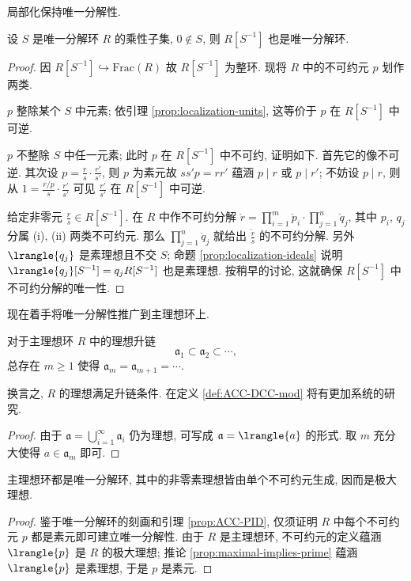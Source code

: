 局部化保持唯一分解性.
\begin{proposition}\label{prop:UFD-localization}
	设 $S$ 是唯一分解环 $R$ 的乘性子集, $0 \notin S$, 则 $R[S^{-1}]$ 也是唯一分解环.
\end{proposition}
\begin{proof}
	因 $R[S^{-1}] \hookrightarrow \text{Frac}(R)$ 故 $R[S^{-1}]$ 为整环. 现将 $R$ 中的不可约元 $p$ 划作两类.
	\begin{inparaenum}[(i)]
		\item $p$ 整除某个 $S$ 中元素; 依引理 \ref{prop:localization-units}, 这等价于 $p$ 在 $R[S^{-1}]$ 中可逆.
		\item $p$ 不整除 $S$ 中任一元素; 此时 $p$ 在 $R[S^{-1}]$ 中不可约, 证明如下. 首先它的像不可逆. 其次设 $p = \frac{r}{s} \cdot \frac{r'}{s'}$, 则 $p$ 为素元故 $ss'p = rr'$ 蕴涵 $p \mid r$ 或 $p \mid r'$; 不妨设 $p \mid r$, 则从 $1 = \frac{r/p}{s} \cdot \frac{r'}{s'}$ 可见 $\frac{r'}{s'}$ 在 $R[S^{-1}]$ 中可逆.
	\end{inparaenum}

	给定非零元 $\frac{r}{s} \in R[S^{-1}]$. 在 $R$ 中作不可约分解 $\mathring{r} = \prod_{i=1}^m \mathring{p}_i \cdot \prod_{j=1}^n \mathring{q}_j$, 其中 $p_i$, $q_j$ 分属 (i), (ii) 两类不可约元. 那么 $\prod_{j=1}^n \mathring{q}_j$ 就给出 $\mathring{\frac{r}{s}}$ 的不可约分解. 另外 $\lrangle{q_j}$ 是素理想且不交 $S$; 命题 \ref{prop:localization-ideals} 说明 $\lrangle{q_j}[S^{-1}] = q_j R[S^{-1}]$ 也是素理想. 按稍早的讨论, 这就确保 $R[S^{-1}]$ 中不可约分解的唯一性.
\end{proof}

现在着手将唯一分解性推广到主理想环上.
\begin{lemma}\label{prop:ACC-PID}
	对于主理想环 $R$ 中的理想升链
	\[ \mathfrak{a}_1 \subset \mathfrak{a}_2 \subset \cdots, \]
	总存在 $m \geq 1$ 使得 $\mathfrak{a}_m = \mathfrak{a}_{m+1} = \cdots$.
\end{lemma}
换言之, $R$ 的理想满足升链条件. 在定义 \ref{def:ACC-DCC-mod} 将有更加系统的研究.
\begin{proof}
	由于 $\mathfrak{a} = \bigcup_{i=1}^\infty \mathfrak{a}_i$ 仍为理想, 可写成 $\mathfrak{a}= \lrangle{a}$ 的形式. 取 $m$ 充分大使得 $a \in \mathfrak{a}_m$ 即可.
\end{proof}

\begin{theorem}\label{prop:PID-UFD}
	主理想环都是唯一分解环, 其中的非零素理想皆由单个不可约元生成, 因而是极大理想.
\end{theorem}
\begin{proof}
	鉴于唯一分解环的刻画和引理 \ref{prop:ACC-PID}, 仅须证明 $R$ 中每个不可约元 $p$ 都是素元即可建立唯一分解性. 由于 $R$ 是主理想环, 不可约元的定义蕴涵 $\lrangle{p}$ 是 $R$ 的极大理想; 推论 \ref{prop:maximal-implies-prime} 蕴涵 $\lrangle{p}$ 是素理想, 于是 $p$ 是素元.
\end{proof}

